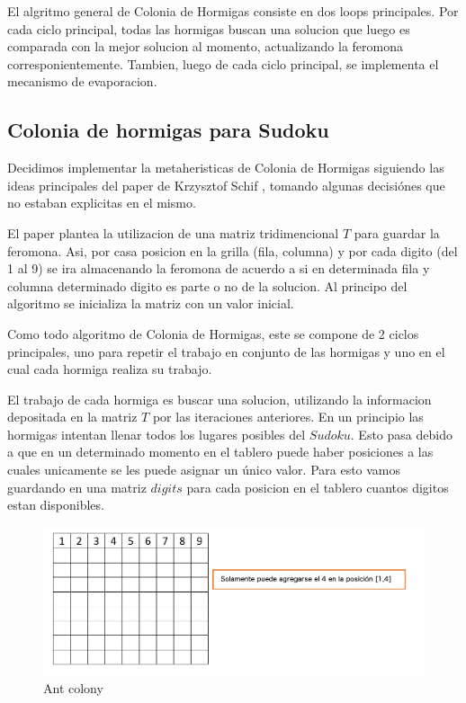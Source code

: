 El algritmo general de Colonia de Hormigas consiste en dos loops principales. 
Por cada ciclo principal, todas las hormigas buscan una solucion que luego es 
comparada con la mejor solucion al momento, actualizando la feromona corresponientemente. Tambien,
luego de cada ciclo principal, se implementa  el mecanismo de evaporacion. 

\clearpage

\subsection{Colonia de hormigas para Sudoku}

Decidimos implementar la metaheristicas de Colonia de Hormigas siguiendo las 
ideas principales del paper de Krzysztof Schif \cite{ant_colony}, tomando 
algunas decisiónes que no estaban explicitas en el mismo.

El paper plantea la utilizacion de una matriz tridimencional $T$ para guardar la 
feromona. Asi, por casa posicion en la grilla (fila, columna) y por cada digito (del 1 al 9) 
se ira almacenando la feromona de acuerdo a si en determinada fila y columna 
determinado digito es parte o no de la solucion. Al principo del algoritmo se 
inicializa la matriz con un valor inicial.

Como todo algoritmo de Colonia de Hormigas, este se compone de 2 ciclos 
principales, uno para repetir el trabajo en conjunto de las hormigas y uno en el 
cual cada hormiga realiza su trabajo. 

El trabajo de cada hormiga es buscar una solucion, utilizando la informacion 
depositada en la matriz $T$ por las iteraciones anteriores. En un principio las 
hormigas intentan llenar todos los lugares posibles del $Sudoku$. Esto pasa 
debido a que en un determinado momento en el tablero puede haber posiciones a 
las cuales unicamente se les puede asignar un único valor. Para esto vamos 
guardando en una matriz $digits$ para cada posicion en el tablero cuantos digitos estan disponibles.  

\begin{figure}[h]
	\centering
	\includegraphics[scale=0.4]{./img/soloundigitoa.png}
	\caption{Ant colony}
	\label{img:soloundigito}
\end{figure}

